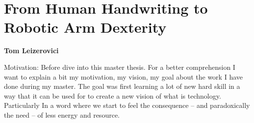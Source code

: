 \vspace*{4cm}
\chapter*{\centering \Huge From Human Handwriting to\\
Robotic Arm Dexterity}

\begin{center}
    \textbf{Tom Leizerovici}  
\end{center}
Motivation: Before dive into this master thesis. For a better comprehension I want to explain a bit my motivation, my vision, my goal about the work I have done during my master. The goal was first learning a lot of new hard skill in a way that it can be used for to create a new vision of what is technology. Particularly In a word where we start to feel the consequence -- and paradoxically the need -- of less energy and resource. 



\pagebreak

